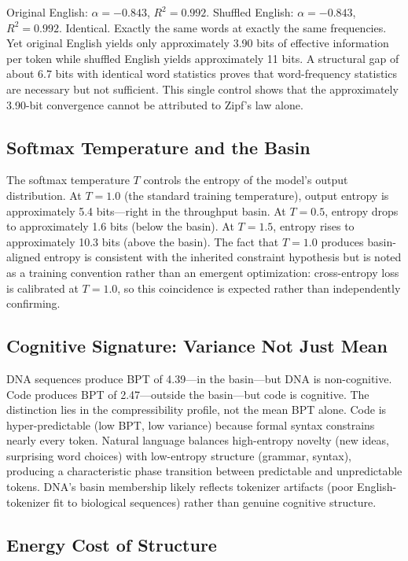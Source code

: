 \documentclass[11pt]{article}
\begin{document}
Original English: $\alpha = -0.843$, $R^2 = 0.992$. Shuffled English: $\alpha = -0.843$, $R^2 = 0.992$. Identical. Exactly the same words at exactly the same frequencies. Yet original English yields only approximately 3.90 bits of effective information per token while shuffled English yields approximately 11 bits. A structural gap of about 6.7 bits with identical word statistics proves that word-frequency statistics are necessary but not sufficient. This single control shows that the approximately 3.90-bit convergence cannot be attributed to Zipf's law alone.

\subsection{Softmax Temperature and the Basin}

The softmax temperature $T$ controls the entropy of the model's output distribution. At $T = 1.0$ (the standard training temperature), output entropy is approximately 5.4 bits---right in the throughput basin. At $T = 0.5$, entropy drops to approximately 1.6 bits (below the basin). At $T = 1.5$, entropy rises to approximately 10.3 bits (above the basin). The fact that $T = 1.0$ produces basin-aligned entropy is consistent with the inherited constraint hypothesis but is noted as a training convention rather than an emergent optimization: cross-entropy loss is calibrated at $T = 1.0$, so this coincidence is expected rather than independently confirming.

\subsection{Cognitive Signature: Variance Not Just Mean}

DNA sequences produce BPT of 4.39---in the basin---but DNA is non-cognitive. Code produces BPT of 2.47---outside the basin---but code is cognitive. The distinction lies in the compressibility profile, not the mean BPT alone. Code is hyper-predictable (low BPT, low variance) because formal syntax constrains nearly every token. Natural language balances high-entropy novelty (new ideas, surprising word choices) with low-entropy structure (grammar, syntax), producing a characteristic phase transition between predictable and unpredictable tokens. DNA's basin membership likely reflects tokenizer artifacts (poor English-tokenizer fit to biological sequences) rather than genuine cognitive structure.

\subsection{Energy Cost of Structure}
\end{document}
